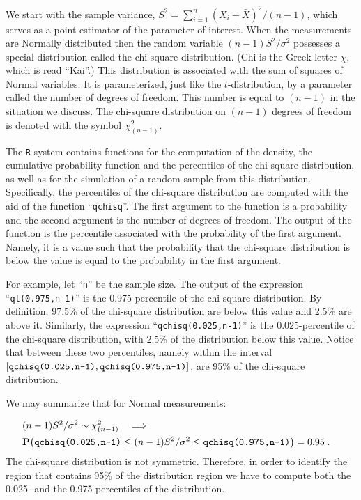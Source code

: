 \documentclass[]{krantz}
\newcommand{\Prob}{\mathbf{P}}
\theoremstyle{definition}
\theoremstyle{definition}
\theoremstyle{definition}
\theoremstyle{remark}
\begin{document}
We start with the sample variance,
\(S^2 = \sum_{i=1}^n (X_i - \bar X)^2/(n-1)\), which serves as a point
estimator of the parameter of interest. When the measurements are
Normally distributed then the random variable \((n-1)S^2/\sigma^2\)
possesses a special distribution called the chi-square distribution.
(Chi is the Greek letter \(\chi\), which is read ``Kai''.) This distribution
is associated with the sum of squares of Normal variables. It is
parameterized, just like the \(t\)-distribution, by a parameter called the
number of degrees of freedom. This number is equal to \((n-1)\) in the
situation we discuss. The chi-square distribution on \((n-1)\) degrees of
freedom is denoted with the symbol \(\chi^2_{(n-1)}\).

The \texttt{R} system contains functions for the computation of the density,
the cumulative probability function and the percentiles of the
chi-square distribution, as well as for the simulation of a random
sample from this distribution. Specifically, the percentiles of the
chi-square distribution are computed with the aid of the function
``\texttt{qchisq}''. The first argument to the function is a probability and the
second argument is the number of degrees of freedom. The output of the
function is the percentile associated with the probability of the first
argument. Namely, it is a value such that the probability that the
chi-square distribution is below the value is equal to the probability
in the first argument.

For example, let ``\texttt{n}'' be the sample size. The output of the expression
``\texttt{qt(0.975,n-1)}'' is the 0.975-percentile of the chi-square
distribution. By definition, 97.5\% of the chi-square distribution are
below this value and 2.5\% are above it. Similarly, the expression
``\texttt{qchisq(0.025,n-1)}'' is the 0.025-percentile of the chi-square
distribution, with 2.5\% of the distribution below this value. Notice
that between these two percentiles, namely within the interval
\([\mbox{\texttt{qchisq(0.025,n-1)}}, \mbox{\texttt{qchisq(0.975,n-1)}}]\),
are 95\% of the chi-square distribution.

We may summarize that for Normal measurements:

\[\begin{aligned}
\lefteqn{(n-1)S^2/\sigma^2 \sim \chi^2_{(n-1)} \quad \Longrightarrow }\\ & \Prob \big( \mbox{\texttt{qchisq(0.025,n-1)}} \leq (n-1)S^2/\sigma^2  \leq \mbox{\texttt{qchisq(0.975,n-1)}} \big) = 0.95\;.\end{aligned}\]
The chi-square distribution is not symmetric. Therefore, in order to
identify the region that contains 95\% of the distribution region we have
to compute both the 0.025- and the 0.975-percentiles of the
distribution.
\end{document}

